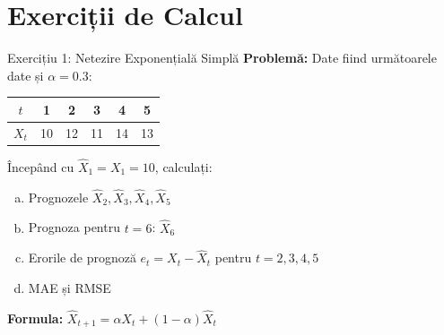 \documentclass[9pt, aspectratio=169, t]{beamer}
\begin{document}
\section{Exerciții de Calcul}

\begin{frame}{Exercițiu 1: Netezire Exponențială Simplă}
    \textbf{Problemă:} Date fiind următoarele date și $\alpha = 0.3$:

    \begin{center}
    \begin{tabular}{c|ccccc}
        $t$ & 1 & 2 & 3 & 4 & 5 \\
        \hline
        $X_t$ & 10 & 12 & 11 & 14 & 13 \\
    \end{tabular}
    \end{center}

    Începând cu $\hat{X}_1 = X_1 = 10$, calculați:

    \vspace{0.3cm}

    \begin{enumerate}[a)]
        \item Prognozele $\hat{X}_2, \hat{X}_3, \hat{X}_4, \hat{X}_5$
        \item Prognoza pentru $t = 6$: $\hat{X}_6$
        \item Erorile de prognoză $e_t = X_t - \hat{X}_t$ pentru $t = 2, 3, 4, 5$
        \item MAE și RMSE
    \end{enumerate}

    \vspace{0.3cm}

    \textbf{Formula:} $\hat{X}_{t+1} = \alpha X_t + (1-\alpha)\hat{X}_t$
\end{frame}
\end{document}
